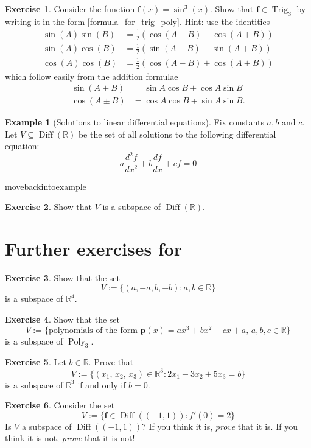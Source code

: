 \documentclass[a4paper,11pt]{book}
\theoremstyle{definition}
\newtheorem{exercise}{Exercise}
\newtheorem{example_environment}{Example}[chapter]
\newcommand{\ve}[1]{\mathbf{#1}}
\newcommand{\furtherexercises}{\section*{Further exercises for \thesection}}
\newenvironment{example}
	{
		\begin{oframed} 
		\begin{example_environment}
	}
	{
		\end{example_environment}
		\end{oframed}
	}
\DeclareMathOperator{\Diff}{Diff}
\DeclareMathOperator{\Poly}{Poly}
\DeclareMathOperator{\Trig}{Trig}
\begin{document}
\begin{exercise} Consider the function $\ve{f} (x) = \sin^3(x)$. Show that $\ve{f} \in \Trig_3$ by writing it in the form \eqref{formula_for_trig_poly}. Hint: use the identities \label{trig_ex_early}
	\begin{align*}
	\sin(A) \sin(B) &= \frac{1}{2}(\cos(A-B) - \cos(A+B)) \\
	\sin(A) \cos(B) &= \frac{1}{2}(\sin(A-B) + \sin(A+B)) \\
	\cos(A)\cos(B) &= \frac{1}{2}(\cos(A-B) + \cos(A+B))
	\end{align*}
	which follow easily from the addition formulae 
	\begin{align*}
	\sin(A \pm B) &= \sin A \cos B \pm \cos A \sin B \\
	\cos(A \pm B) &= \cos A \cos B \mp \sin A \sin B.
	\end{align*}
\end{exercise}

\begin{example}[Solutions to linear differential equations] Fix constants $a,b$ and $c$. Let $V \subseteq \Diff(\mathbb{R})$ be the set of all solutions to the following differential equation:
\[
 a \frac{d^2f}{dx^2} + b \frac{df}{dx} + cf = 0
\]

\end{example}
movebackintoexample
\begin{exercise} Show that $V$ is a subspace of $\Diff(\mathbb{R})$.
\end{exercise} 


\furtherexercises

\begin{exercise} Show that the set 
\[
 V := \{ (a, -a, b, -b) : a, b \in \mathbb{R} \}
\]
is a subspace of $\mathbb{R}^4$.
\end{exercise}

\begin{exercise} Show that the set
\[
 V := \{ \mbox{polynomials of the form } \ve{p}(x) = ax^3 + bx^2 - cx + a, \, a,b,c \in \mathbb{R}\}
\]
is a subspace of $\Poly_3$.
\end{exercise}

\begin{exercise} Let $b \in \mathbb{R}$. Prove that 
\[
V := \{ (x_1, \, x_2, \, x_3) \in \mathbb{R}^3 : 2x_1 - 3x_2 + 5x_3 = b \}
\]
is a subspace of $\mathbb{R}^3$ if and only if $b=0$.
\end{exercise} 

\begin{exercise} Consider the set
\[
 V := \{ \mathbf{f} \in \Diff((-1, 1)) : f'(0) = 2 \}
\]
Is $V$ a subspace of $\Diff((-1,1))$? If you think it is, {\em prove} that it is. If you think it is not, {\em prove} that it is not!
\end{exercise}
\end{document}
